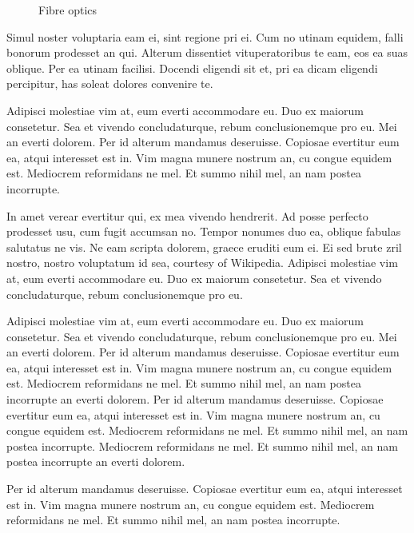 \begin{figure}[htb]
\begin{center}
  \end{center}
  \caption{Fibre optics}
  \label{CHAPTER3_FIG02}
\end{figure}

Simul noster voluptaria eam ei, sint regione pri ei. Cum no utinam equidem, 
falli bonorum prodesset an qui. Alterum dissentiet vituperatoribus te eam, 
eos ea suas oblique. Per ea utinam facilisi. Docendi eligendi sit et, pri ea 
dicam eligendi percipitur, has soleat dolores convenire te.

Adipisci molestiae vim at, eum everti accommodare eu. Duo ex maiorum 
consetetur. Sea et vivendo concludaturque, rebum conclusionemque pro eu. Mei 
an everti dolorem. Per id alterum mandamus deseruisse. Copiosae evertitur eum 
ea, atqui interesset est in. Vim magna munere nostrum an, cu congue equidem 
est. Mediocrem reformidans ne mel. Et summo nihil mel, an nam postea 
incorrupte.

In amet verear evertitur qui, ex mea vivendo hendrerit. Ad posse perfecto 
prodesset usu, cum fugit accumsan no. Tempor nonumes duo ea, oblique fabulas 
salutatus ne vis. Ne eam scripta dolorem, graece eruditi eum ei. Ei sed brute 
zril nostro, nostro voluptatum id sea, courtesy of Wikipedia. \cite{Wikipedia}
Adipisci molestiae vim at, eum everti accommodare eu. Duo ex maiorum 
consetetur. Sea et vivendo concludaturque, rebum conclusionemque pro eu.

Adipisci molestiae vim at, eum everti accommodare eu. Duo ex maiorum 
consetetur. Sea et vivendo concludaturque, rebum conclusionemque pro eu. Mei 
an everti dolorem. Per id alterum mandamus deseruisse. Copiosae evertitur eum 
ea, atqui interesset est in. Vim magna munere nostrum an, cu congue equidem 
est. Mediocrem reformidans ne mel. Et summo nihil mel, an nam postea 
incorrupte an everti dolorem. Per id alterum mandamus deseruisse. Copiosae 
evertitur eum ea, atqui interesset est in. Vim magna munere nostrum an, cu 
congue equidem est. Mediocrem reformidans ne mel. Et summo nihil mel, an nam 
postea incorrupte. Mediocrem reformidans ne mel. Et summo nihil mel, an nam 
postea incorrupte an everti dolorem. 

Per id alterum mandamus deseruisse. Copiosae evertitur eum ea, atqui 
interesset est in. Vim magna munere nostrum an, cu congue equidem est. 
Mediocrem reformidans ne mel. Et summo nihil mel, an nam postea incorrupte.

